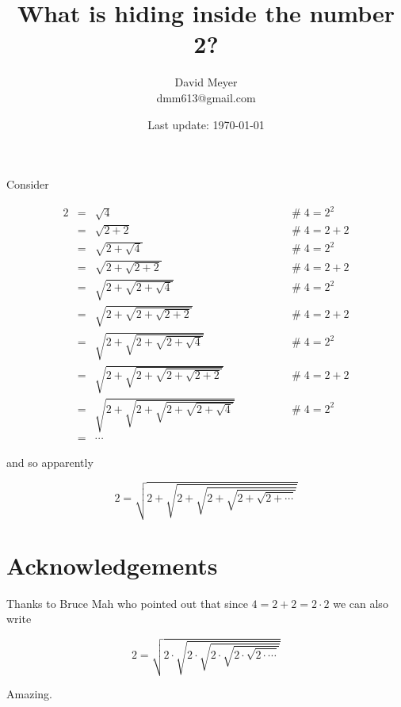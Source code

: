\documentclass[11pt, oneside]{article}
\title{What is hiding inside the number 2?}
\author{David Meyer \\ dmm613@gmail.com}
\date{Last update: \today}
\theoremstyle{definition}
\begin{document}
\maketitle

\noindent
Consider

\begin{equation*}
\begin{array}{llll}
2 
&=& \sqrt{4}											&\qquad \qquad \mathrel{\#} 4 = 2^2 \\
[10pt]
&=& \sqrt{2+2}											&\qquad \qquad \mathrel{\#} 4 = 2+2 \\
[10pt]
&=& \sqrt{2+ \sqrt{4}}									&\qquad \qquad \mathrel{\#} 4 = 2^2 \\
[10pt]
&=& \sqrt{2+ \sqrt{2+2}}								&\qquad \qquad \mathrel{\#} 4 = 2+2 \\
[10pt]
&=& \sqrt{2+ \sqrt{2+\sqrt{4}}}							&\qquad \qquad \mathrel{\#} 4 = 2^2 \\
[10pt]
&=& \sqrt{2+ \sqrt{2+\sqrt{2+2}}}						&\qquad \qquad \mathrel{\#} 4 = 2+2 \\
[5pt]
&=& \sqrt{2+ \sqrt{2+\sqrt{2+\sqrt{4}}}}				&\qquad \qquad \mathrel{\#} 4 = 2^2 \\
[5pt]
&=& \sqrt{2+ \sqrt{2+\sqrt{2+\sqrt{2+2}}}}				&\qquad \qquad \mathrel{\#} 4 = 2+2 \\
[5pt]
&=& \sqrt{2+ \sqrt{2+\sqrt{2+\sqrt{2+\sqrt{4}}}}}		&\qquad \qquad \mathrel{\#} 4 = 2^2 \\
[10pt]
&=& \cdots
\end{array}
\end{equation*}

\noindent
and so apparently 

\begin{equation*}
2 =  \sqrt{2+ \sqrt{2+\sqrt{2+\sqrt{2+\sqrt{2 + \cdots}}}}}
\end{equation*}
%
%
%
\section*{Acknowledgements}
Thanks to Bruce Mah who pointed out that since $4 = 2 + 2 = 2 \cdot2$
we can also write

\begin{equation*}
2 = \sqrt{2 \cdot \sqrt{2 \cdot \sqrt{2 \cdot \sqrt{2 \cdot \sqrt{2 \cdot \cdots}}}}}
\end{equation*}

\noindent
Amazing.

%
%
%
%
%


%
%
\end{document}

